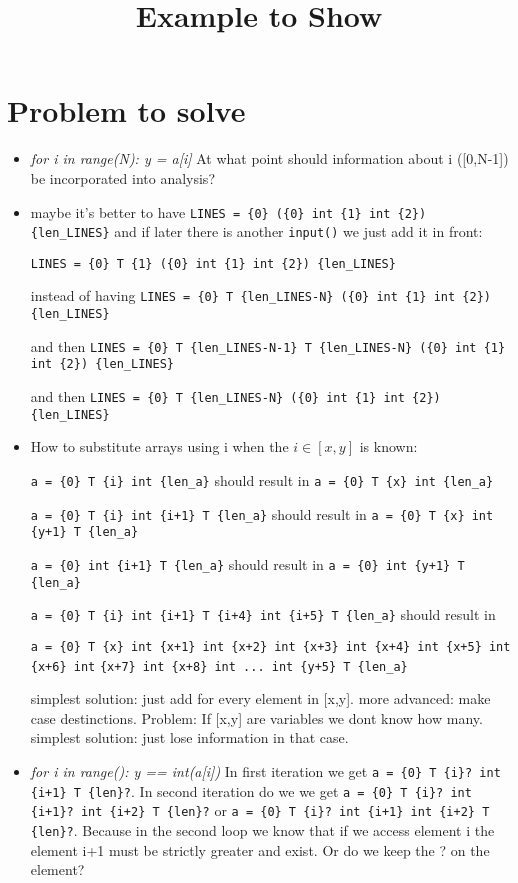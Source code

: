 \documentclass[11pt]{article}
\begin{document}
\title{Example to Show}

\maketitle


\section{Problem to solve}

\begin{itemize}

\item \textit{for i in range(N): y = a[i]} At what point should information about i ([0,N-1]) be incorporated into analysis?


\item maybe it's better to have \verb|LINES = {0} ({0} int {1} int {2}) {len_LINES}| and if later there is another \verb|input()| we just add it in front: 

\verb|LINES = {0} T {1} ({0} int {1} int {2}) {len_LINES}|

instead of having \verb|LINES = {0} T {len_LINES-N} ({0} int {1} int {2}) {len_LINES}| 

and then \verb|LINES = {0} T {len_LINES-N-1} T {len_LINES-N} ({0} int {1} int {2}) {len_LINES}| 

and then \verb|LINES = {0} T {len_LINES-N} ({0} int {1} int {2}) {len_LINES}|


\item How to substitute arrays using i when the $i \in [x,y]$ is known:

\verb|a = {0} T {i} int {len_a}| should result in \verb|a = {0} T {x} int {len_a}|

\verb|a = {0} T {i} int {i+1} T {len_a}| should result in \verb|a = {0} T {x} int {y+1} T {len_a}|

\verb|a = {0} int {i+1} T {len_a}| should result in \verb|a = {0} int {y+1} T {len_a}|

\verb|a = {0} T {i} int {i+1} T {i+4} int {i+5} T {len_a}| should result in 

\verb|a = {0} T {x} int {x+1} int {x+2} int {x+3} int {x+4} int {x+5} int {x+6} int| 
\verb|{x+7} int {x+8} int ... int {y+5} T {len_a}|

simplest solution: just add for every element in [x,y]. more advanced: make case destinctions. Problem: If [x,y] are variables we dont know how many. simplest solution: just lose information in that case.


\item \textit{for i in range(): y == int(a[i])} In first iteration we get \verb|a = {0} T {i}? int {i+1} T {len}?|. In second iteration do we we get \verb|a = {0} T {i}? int {i+1}? int {i+2} T {len}?| or \verb|a = {0} T {i}? int {i+1} int {i+2} T {len}?|. Because in the second loop we know that if we access element i the element i+1 must be strictly greater and exist. Or do we keep the ? on the element?

\end{itemize}
\end{document}
